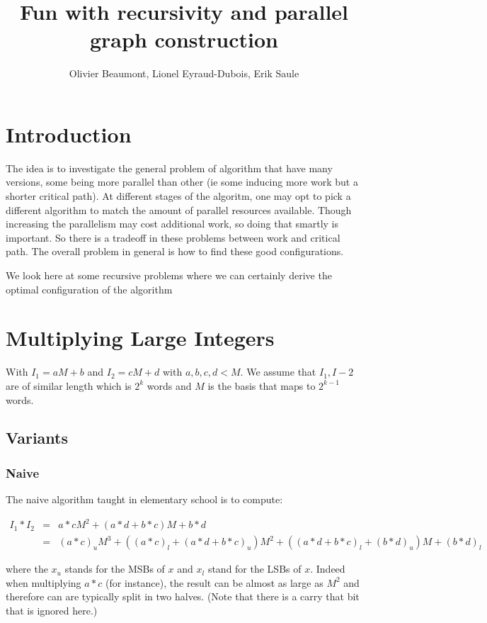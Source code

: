 \documentclass{article}
\author{Olivier Beaumont, Lionel Eyraud-Dubois, Erik Saule}
\title{Fun with recursivity and parallel graph construction}
\begin{document}
\maketitle

\section{Introduction}

The idea is to investigate the general problem of algorithm that have
many versions, some being more parallel than other (ie some inducing more work but a shorter critical path). At different
stages of the algoritm, one may opt to pick a different algorithm to
match the amount of parallel resources available. Though increasing the
parallelism may cost additional work, so doing that smartly is
important. So there is a tradeoff in these problems between work and
critical path. The overall problem in general is how to find these
good configurations.

We look here at some recursive problems where we can certainly derive
the optimal configuration of the algorithm

\section{Multiplying Large Integers}

With $I_1 = aM + b$ and $I_2 = cM + d$ with $a,b,c,d < M$. We assume that
$I_1, I-2$ are of similar length which is $2^k$ words and $M$ is the
basis that maps to $2^{k-1}$ words.

\subsection{Variants}

\subsubsection{Naive}

The naive algorithm taught in elementary school is to compute:

\begin{align}
  I_1 * I_2 & = & a*c M^2 + (a * d + b * c ) M + b*d \\
            & = & (a*c)_{u} M^3 + ((a*c)_{l} + (a * d + b * c )_{u}) M^2 + ( (a * d + b * c )_{l} + (b*d)_{u} ) M + (b*d)_{l}
\end{align}

where the $x_u$ stands for the MSBs of $x$ and $x_l$ stand for the
LSBs of $x$. Indeed when multiplying $a*c$ (for instance), the result
can be almost as large as $M^2$ and therefore can are typically split
in two halves. (Note that there is a carry that bit that is ignored
here.)
\end{document}
